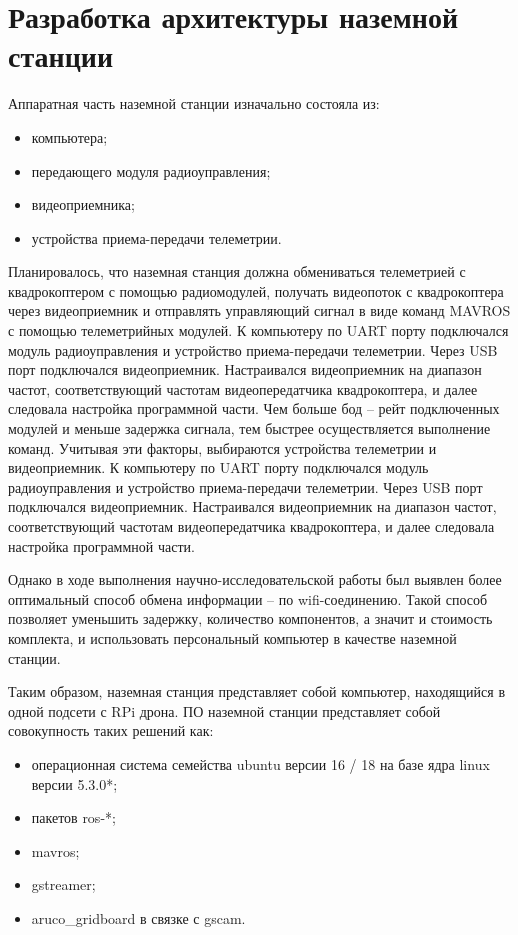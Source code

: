 \section{Разработка архитектуры наземной станции}

Аппаратная часть наземной станции изначально состояла из:
\begin{itemize}
	\item компьютера;
	\item передающего модуля радиоуправления;
	\item видеоприемника;
	\item устройства приема-передачи телеметрии.
\end{itemize}
Планировалось, что наземная станция должна обмениваться телеметрией с квадрокоптером с помощью радиомодулей, получать видеопоток с квадрокоптера через видеоприемник и отправлять управляющий сигнал в виде команд MAVROS с помощью телеметрийных модулей. 
К компьютеру по UART порту подключался модуль радиоуправления и устройство приема-передачи телеметрии. Через USB порт подключался видеоприемник. Настраивался видеоприемник на диапазон частот, соответствующий частотам видеопередатчика квадрокоптера, и далее следовала настройка программной части.
Чем больше бод -- рейт подключенных модулей и меньше задержка сигнала, тем быстрее осуществляется выполнение команд. Учитывая эти факторы, выбираются устройства телеметрии и видеоприемник.
К компьютеру по UART порту подключался модуль радиоуправления и устройство приема-передачи телеметрии. Через USB порт подключался видеоприемник. Настраивался видеоприемник на диапазон частот, соответствующий частотам видеопередатчика квадрокоптера, и далее следовала настройка программной части.

Однако в ходе выполнения научно-исследовательской работы \cite{nir3} был выявлен более оптимальный способ обмена информации -- по wifi-соединению. Такой способ позволяет уменьшить задержку, количество компонентов, а значит и стоимость комплекта, и использовать персональный компьютер в качестве наземной станции. 

Таким образом, наземная станция представляет собой компьютер, находящийся в одной подсети с RPi дрона.
ПО наземной станции представляет собой совокупность таких решений как:
\begin{itemize}
	\item операционная система семейства ubuntu версии 16 / 18 на базе ядра linux версии 5.3.0*;
	\item пакетов ros-*;
	\item mavros;
	\item gstreamer;
	\item aruco\_gridboard в связке с gscam.
\end{itemize}

